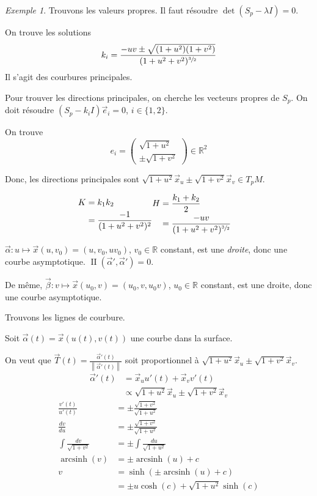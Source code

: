 \documentclass{report}
\theoremstyle{definition}
\theoremstyle{remark}
\newtheorem*{exem}{Exemple}
\def\RR{\mathbb{R}}
\def\dff{\operatorname{II}}
\def\arcsinh{\operatorname{arcsinh}}
\newcommand*{\norme}[1]{\left\|#1\right\|}
\begin{document}
\begin{exem}
		Trouvons les valeurs propres. Il faut r\'esoudre $\det(S_p-\lambda I) = 0$.

		On trouve les solutions \[ k_i = \frac{-uv \pm \sqrt{(1+u^2)(1+v^2)}}{(1+u^2+v^2)^{\sfrac{3}{2}}} \] Il s'agit des courbures principales.

		Pour trouver les directions principales, on cherche les vecteurs propres de $S_p$. On doit r\'esoudre $(S_p-k_iI)\vec e_i=0$, $i\in\{1,2\}$.

		On trouve \[ e_i = \begin{pmatrix}
			\sqrt{1+u^2}\\\pm \sqrt{1+v^2}
		\end{pmatrix}\in\RR^2 \]

		Donc, les directions principales sont $\sqrt{1+u^2}\vec x_u \pm \sqrt{1+v^2}\vec x_v\in T_pM$.

		\begin{align*}
			\begin{split}
				K&= k_1k_2\\
				&= \frac{-1}{(1+u^2+v^2)^2}
			\end{split}
			&
			\begin{split}
				H&= \frac{k_1+k_2}{2}\\
				&= \frac{-uv}{(1+u^2+v^2)^{\sfrac{3}{2}}}
			\end{split}
		\end{align*}

		$\vec\alpha:u\mapsto\vec x(u,v_0) = (u,v_0,uv_0)$, $v_0\in\RR$ constant, est une \emph{droite}, donc une courbe asymptotique. $\dff(\vec\alpha',\vec\alpha')=0$.

		De m\^eme, $\vec\beta:v\mapsto\vec x(u_0,v)=(u_0,v,u_0v)$, $u_0\in\RR$ constant, est une droite, donc une courbe asymptotique.

		Trouvons les lignes de courbure.

		Soit $\vec\alpha(t)=\vec x(u(t),v(t))$ une courbe dans la surface.

		On veut que $\vec T(t) = \frac{\vec\alpha'(t)}{\norme{\vec\alpha'(t)}}$ soit proportionnel \`a $\sqrt{1+u^2}\vec x_u \pm \sqrt{1+v^2}\vec x_v$.
		\begin{align*}
			\vec\alpha'(t)&= \vec x_uu'(t)+\vec x_vv'(t)\\
			&\propto \sqrt{1+u^2}\vec x_u \pm \sqrt{1+v^2}\vec x_v
		\end{align*}
		\begin{align*}
			\frac{v'(t)}{u'(t)}&= \pm\frac{\sqrt{1+v^2}}{\sqrt{1+u^2}}\\
			\frac{dv}{du}&= \pm\frac{\sqrt{1+v^2}}{\sqrt{1+u^2}}\\
			\int \frac{dv}{\sqrt{1+v^2}}&= \pm\int \frac{du}{\sqrt{1+u^2}}\\
			\arcsinh(v)&= \pm\arcsinh(u)+c\\
			v&= \sinh(\pm\arcsinh(u)+c)\\
			&= \pm u\cosh(c)+\sqrt{1+u^2}\sinh(c)
		\end{align*}


\end{exem}
\end{document}
